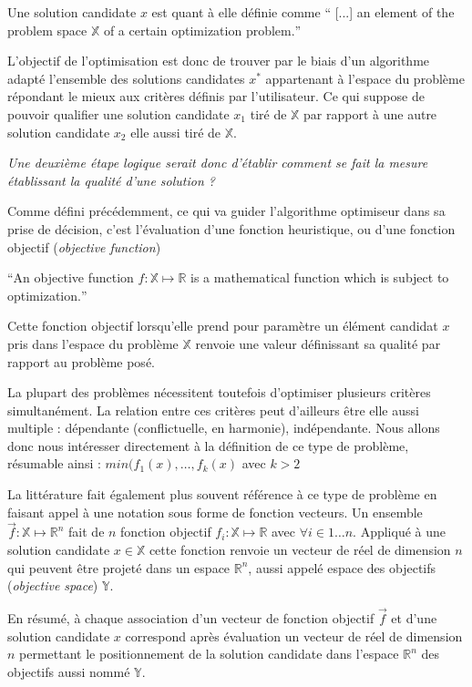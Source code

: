 Une solution candidate $x$ est quant à elle définie comme \foreignquote{english}{ [...] an element of the problem space $ \mathbb{X}$ of a certain optimization problem.}

L'objectif de l'optimisation est donc de trouver par le biais d'un algorithme adapté l'ensemble des solutions candidates $x^*$ appartenant à l'espace du problème répondant le mieux aux critères définis par l'utilisateur. Ce qui suppose de pouvoir qualifier une solution candidate $x_1$ tiré de $\mathbb{X}$ par rapport à une autre solution candidate $x_2$ elle aussi tiré de $\mathbb{X}$.

\textit{Une deuxième étape logique serait donc d'établir comment se fait la mesure établissant la qualité d'une solution ?}

Comme défini précédemment, ce qui va guider l'algorithme optimiseur dans sa prise de décision, c'est l'évaluation d'une fonction heuristique, ou d'une fonction objectif (\textit{objective function}) 

\foreignquote{english}{An objective function $f: \mathbb{X} \mapsto \mathbb{R}$ is a mathematical function which is subject to optimization.}

Cette fonction objectif lorsqu'elle prend pour paramètre un élément candidat $x$ pris dans l'espace du problème $ \mathbb{X}$ renvoie une valeur définissant sa qualité par rapport au problème posé. \autocite[44]{Weise2011}

\sloppy La plupart des problèmes nécessitent toutefois d'optimiser plusieurs critères simultanément. La relation entre ces critères peut d'ailleurs être elle aussi multiple : dépendante (conflictuelle, en harmonie), indépendante. Nous allons donc nous intéresser directement à la définition de ce type de problème, résumable ainsi :  $min(f_1(x), \dotsc, f_k(x)$ avec $k > 2$

La littérature fait également plus souvent référence à ce type de problème en faisant appel à une notation sous forme de fonction vecteurs. Un ensemble $\vec{f} : \mathbb{X} \mapsto \mathbb{R}^n$ fait de $n$ fonction objectif $f_i : \mathbb{X} \mapsto \mathbb{R}$ avec $\forall i \in 1 \dotsc n$. Appliqué à une solution candidate $x \in \mathbb{X}$ cette fonction renvoie un vecteur de réel de dimension $n$ qui peuvent être projeté dans un espace $\mathbb{R}^n$, aussi appelé espace des objectifs (\textit{objective space}) $\mathbb{Y}$.

En résumé, à chaque association d'un vecteur de fonction objectif $\vec{f}$ et d'une solution candidate $x$ correspond après évaluation un vecteur de réel de dimension $n$ permettant le positionnement de la solution candidate dans l'espace $\mathbb{R}^n$ des objectifs aussi nommé $\mathbb{Y}$.

